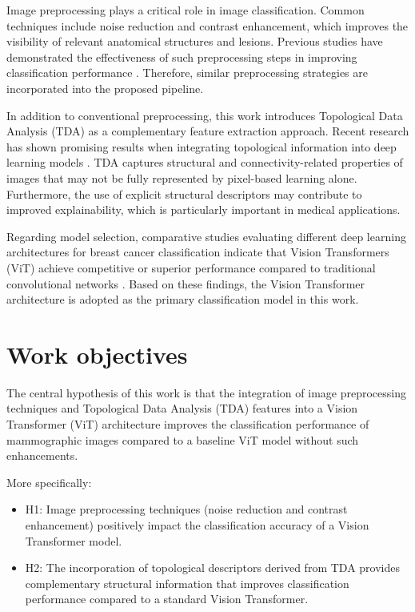 \documentclass[ENG]{TFUOC}%
\begin{document}
Image preprocessing plays a critical role in image classification. Common techniques include noise reduction and contrast enhancement, which improves the visibility of relevant anatomical structures and lesions. Previous studies have demonstrated the effectiveness of such preprocessing steps in improving classification performance \cite{DeepLearningEmpoweredBreastCancerDiagnosis, ImageTreatement}. Therefore, similar preprocessing strategies are incorporated into the proposed pipeline.

In addition to conventional preprocessing, this work introduces Topological Data Analysis (TDA) as a complementary feature extraction approach. Recent research has shown promising results when integrating topological information into deep learning models \cite{TopoTxR}. TDA captures structural and connectivity-related properties of images that may not be fully represented by pixel-based learning alone. Furthermore, the use of explicit structural descriptors may contribute to improved explainability, which is particularly important in medical applications.

Regarding model selection, comparative studies evaluating different deep learning architectures for breast cancer classification indicate that Vision Transformers (ViT) achieve competitive or superior performance compared to traditional convolutional networks \cite{Comparation, Comparation2}. Based on these findings, the Vision Transformer architecture is adopted as the primary classification model in this work.

\section{Work objectives}

The central hypothesis of this work is that the integration of image preprocessing techniques and Topological Data Analysis (TDA) features into a Vision Transformer (ViT) architecture improves the classification performance of mammographic images compared to a baseline ViT model without such enhancements.

More specifically:

\begin{itemize}
    \item H1: Image preprocessing techniques (noise reduction and contrast enhancement) positively impact the classification accuracy of a Vision Transformer model.
    \item H2: The incorporation of topological descriptors derived from TDA provides complementary structural information that improves classification performance compared to a standard Vision Transformer.
\end{itemize}
\end{document}
